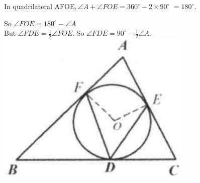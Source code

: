 \documentclass[10pt]{article}
\begin{document}
In quadrilateral \(\mathrm{AFOE}, \angle A+\angle F O E=360^{\circ}-2 \times 90^{\circ}\) \(=180^{\circ}\).

So \(\angle F O E=180^{\circ}-\angle A\)\\
But \(\angle F D E=\frac{1}{2} \angle F O E\). So \(\angle F D E=90^{\circ}-\frac{1}{2} \angle A\).\\
\includegraphics[max width=\textwidth, center]{2025_04_17_97bc1f7e44d93c271a88g-157(2)}
\end{document}
